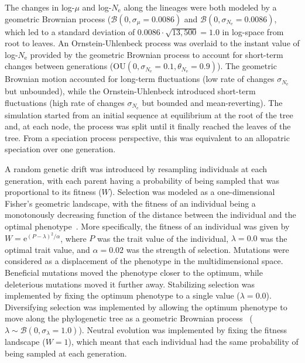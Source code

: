 \documentclass{article}
\newcommand{\Multiply}{\cdot}
\newcommand{\e}{\text{e}}
\newcommand{\Ne}{N_{\text{e}}}
\newcommand{\Trait}{P}
\newcommand{\MutationRate}{\mu}
\newcommand{\brownian}{\mathcal{B}}
\begin{document}
The changes in log-$\MutationRate$ and log-$\Ne$ along the lineages were both modeled by a geometric Brownian process ($\brownian \left(0, \sigma_{\MutationRate}=0.0086\right)$ and $\brownian \left(0, \sigma_{\Ne}=0.0086\right)$, which led to a standard deviation of $0.0086 \Multiply \sqrt {13,500} = 1.0$ in log-space from root to leaves.
An Ornstein-Uhlenbeck process was overlaid to the instant value of log-$\Ne$ provided by the geometric Brownian process to account for short-term changes between generations ($\text{OU} \left(0, \sigma_{\Ne}=0.1, \theta_{\Ne}=0.9\right)$).
The geometric Brownian motion accounted for long-term fluctuations (low rate of changes $\sigma_{\Ne}$ but unbounded), while the Ornstein-Uhlenbeck introduced short-term fluctuations (high rate of changes $\sigma_{\Ne}$ but bounded and mean-reverting).
The simulation started from an initial sequence at equilibrium at the root of the tree and, at each node, the process was split until it finally reached the leaves of the tree.
From a speciation process perspective, this was equivalent to an allopatric speciation over one generation.

A random genetic drift was introduced by resampling individuals at each generation, with each parent having a probability of being sampled that was proportional to its fitness ($W$).
Selection was modeled as a one-dimensional Fisher's geometric landscape, with the fitness of an individual being a monotonously decreasing function of the distance between the individual and the optimal phenotype~\parencite{tenaillon_utility_2014,blanquart_epistasis_2016}.
More specifically, the fitness of an individual was given by $W = \e^{(\Trait - \lambda)^2/ \alpha}$, where $\Trait$ was the trait value of the individual, $\lambda=0.0$ was the optimal trait value, and $\alpha=0.02$ was the strength of selection.
Mutations were considered as a displacement of the phenotype in the multidimensional space.
Beneficial mutations moved the phenotype closer to the optimum, while deleterious mutations moved it further away.
Stabilizing selection was implemented by fixing the optimum phenotype to a single value ($\lambda=0.0$).
Diversifying selection was implemented by allowing the optimum phenotype to move along the phylogenetic tree as a geometric Brownian process~\parencite{hansen_stabilizing_1997} ($\lambda \sim \brownian \left(0, \sigma_{\lambda}=1.0\right)$).
Neutral evolution was implemented by fixing the fitness landscape ($W=1$), which meant that each individual had the same probability of being sampled at each generation.
\end{document}
